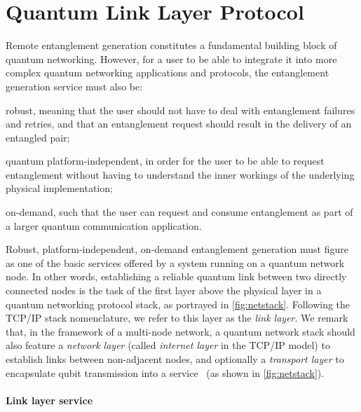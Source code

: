 \section{Quantum Link Layer Protocol}
\label{sec:netstack:link}

Remote entanglement generation constitutes a fundamental building block of quantum networking.
However, for a user to be able to integrate it into more complex quantum networking applications and
protocols, the entanglement generation service must also be:
%
\begin{enumerate*}[label=(\alph*)]
    \item robust, meaning that the user should not have to deal with entanglement failures and
          retries, and that an entanglement request should result in the delivery of an entangled
          pair;
    \item quantum platform-independent, in order for the user to be able to request entanglement
          without having to understand the inner workings of the underlying physical implementation;
    \item on-demand, such that the user can request and consume entanglement as part of a larger
          quantum communication application.
\end{enumerate*}
Robust, platform-independent, on-demand entanglement generation must figure as one of the basic
services offered by a system running on a quantum network node. In other words, establishing a
reliable quantum link between two directly connected nodes is the task of the first layer above the
physical layer in a quantum networking protocol stack, as portrayed in \cref{fig:netstack}.
Following the TCP/IP stack nomenclature, we refer to this layer as the \emph{link layer}. We remark that,
in the framework of a multi-node network, a quantum network stack should also feature a
\emph{network layer} (called \emph{internet layer} in the TCP/IP model) to establish links between
non-adjacent nodes, and optionally a \emph{transport layer} to encapsulate qubit transmission into a
service~\cite{dahlberg_2019_egp, kozlowski_2020_qnp, pirker_2019_quantum} (as shown in
\cref{fig:netstack}).

\paragraph{Link layer service}

